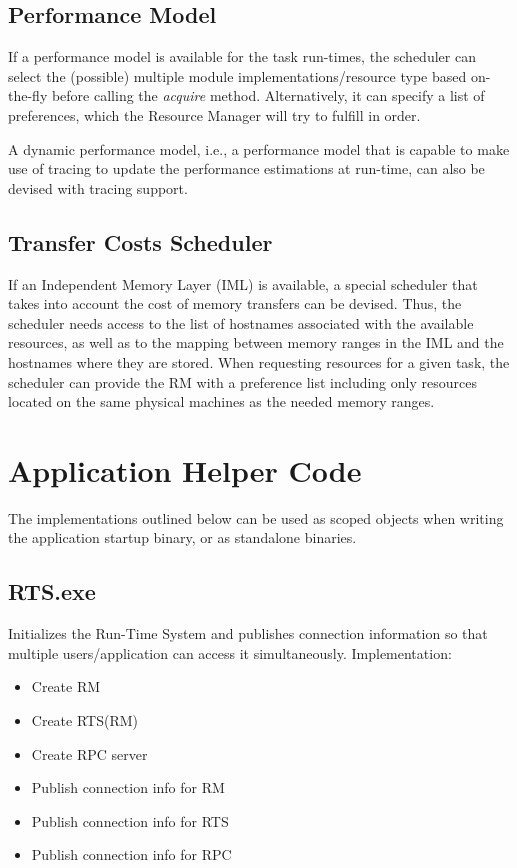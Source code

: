 \documentclass[10pt]{article}
\newcommand{\rts}{RTS\xspace}
\newcommand{\rman}{RM\xspace}
\begin{document}
\subsection{Performance Model}
If a performance model is available for the task run-times, the scheduler can
select the (possible) multiple module implementations/resource type based
on-the-fly before calling the \emph{acquire} method. 
Alternatively, it can specify a list of preferences, which the Resource Manager
will try to fulfill in order. 

A dynamic performance model, i.e., a performance model that is capable to make
use of tracing to update the performance estimations at run-time, can also be
devised with tracing support. 

\subsection{Transfer Costs Scheduler}
If an Independent Memory Layer (IML) is available, a special scheduler that
takes into account the cost of memory transfers can be devised.
Thus, the scheduler needs access to the list of hostnames associated with the
available resources, as well as to the mapping between memory ranges in the IML
and the hostnames where they are stored.
When requesting resources for a given task, the scheduler can provide the RM
with a preference list including only resources located on the same physical
machines as the needed memory ranges.


\section{Application Helper Code}
The implementations outlined below can be used as scoped objects when writing 
the application startup binary, or as standalone binaries.

\subsection{RTS.exe}
Initializes the Run-Time System and publishes connection information so that 
multiple users/application can access it simultaneously.
Implementation:
\begin{itemize}
    \item Create \rman
    \item Create \rts(\rman)
    \item Create RPC server
    \item Publish connection info for \rman
    \item Publish connection info for \rts
    \item Publish connection info for RPC
\end{itemize}
\end{document}
